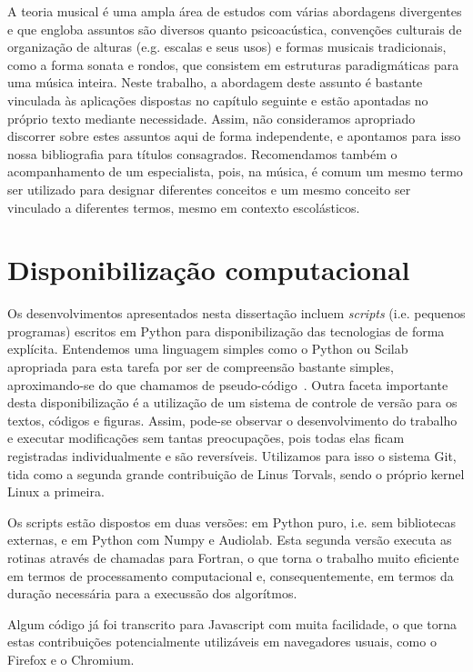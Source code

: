 A teoria musical é uma ampla área de estudos com várias abordagens divergentes e que engloba assuntos são diversos quanto psicoacústica, convenções culturais de organização de alturas (e.g. escalas e seus usos) e formas musicais tradicionais, como a forma sonata e rondos, que consistem em estruturas paradigmáticas para uma música inteira. Neste trabalho, a abordagem deste assunto é bastante vinculada às aplicações dispostas no capítulo seguinte e estão apontadas no próprio texto mediante necessidade. Assim, não consideramos apropriado discorrer sobre estes assuntos aqui de forma independente, e apontamos para isso nossa bibliografia para títulos consagrados. Recomendamos também o acompanhamento de um especialista, pois, na música, é comum um mesmo termo ser utilizado para designar diferentes conceitos e um mesmo conceito ser vinculado a diferentes termos, mesmo em contexto escolásticos.


    \section{Disponibilização computacional}
Os desenvolvimentos apresentados nesta dissertação incluem \emph{scripts} (i.e. pequenos programas) escritos em Python para disponibilização das tecnologias de forma explícita. Entendemos uma linguagem simples como o Python ou Scilab apropriada para esta tarefa
por ser de compreensão bastante simples, aproximando-se do que chamamos de pseudo-código~\cite{tutPython}. Outra faceta importante desta disponibilização é a utilização de um sistema de controle de versão para os textos, códigos e figuras. Assim, pode-se observar o desenvolvimento do trabalho e executar modificações sem tantas preocupações, pois todas elas ficam registradas individualmente e são reversíveis. Utilizamos para isso o sistema Git, tida como a segunda grande contribuição de Linus Torvals, sendo o próprio kernel Linux a primeira.

Os scripts estão dispostos em duas versões: em Python puro, i.e. sem bibliotecas externas, e em Python com Numpy e Audiolab. Esta segunda versão executa as rotinas através de chamadas para Fortran, o que torna o trabalho muito eficiente em termos de processamento computacional e, consequentemente, em termos da duração necessária para a execussão dos algorítmos.

Algum código já foi transcrito para Javascript com muita facilidade, o que torna estas contribuições potencialmente utilizáveis em navegadores usuais, como o Firefox e o Chromium.


